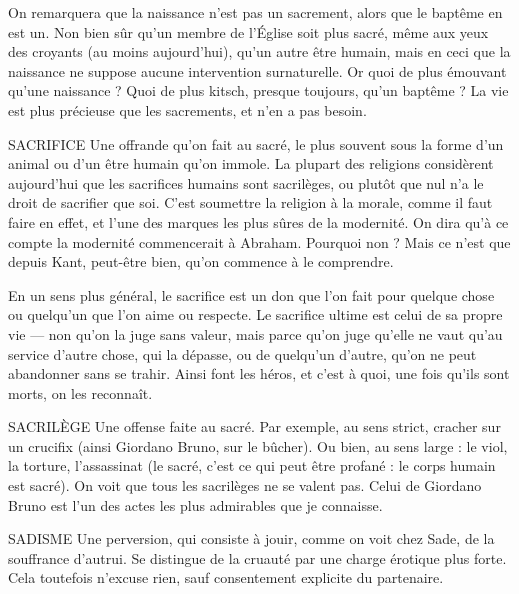 On remarquera que la naissance n’est pas un sacrement, alors que le baptême
en est un. Non bien sûr qu’un membre de l’Église soit plus sacré, même
aux yeux des croyants (au moins aujourd’hui), qu’un autre être humain, mais
en ceci que la naissance ne suppose aucune intervention surnaturelle. Or quoi
de plus émouvant qu’une naissance ? Quoi de plus kitsch, presque toujours,
qu’un baptême ? La vie est plus précieuse que les sacrements, et n'en a pas
besoin.

SACRIFICE Une offrande qu’on fait au sacré, le plus souvent sous la forme
d’un animal ou d’un être humain qu’on immole. La plupart des
religions considèrent aujourd’hui que les sacrifices humains sont sacrilèges, ou
plutôt que nul n’a le droit de sacrifier que soi. C’est soumettre la religion à la
morale, comme il faut faire en effet, et l’une des marques les plus sûres de la
modernité. On dira qu’à ce compte la modernité commencerait à Abraham.
Pourquoi non ? Mais ce n’est que depuis Kant, peut-être bien, qu'on commence
à le comprendre.

En un sens plus général, le sacrifice est un don que l’on fait pour quelque
chose ou quelqu'un que l’on aime ou respecte. Le sacrifice ultime est celui de
sa propre vie — non qu’on la juge sans valeur, mais parce qu’on juge qu’elle ne
vaut qu’au service d’autre chose, qui la dépasse, ou de quelqu'un d’autre, qu'on
ne peut abandonner sans se trahir. Ainsi font les héros, et c’est à quoi, une fois
qu'ils sont morts, on les reconnaît.

SACRILÈGE Une offense faite au sacré. Par exemple, au sens strict, cracher
sur un crucifix (ainsi Giordano Bruno, sur le bûcher). Ou bien,
au sens large : le viol, la torture, l'assassinat (le sacré, c’est ce qui peut être
profané : le corps humain est sacré). On voit que tous les sacrilèges ne se valent
pas. Celui de Giordano Bruno est l’un des actes les plus admirables que je
connaisse.

SADISME Une perversion, qui consiste à jouir, comme on voit chez Sade,
de la souffrance d’autrui. Se distingue de la cruauté par une
charge érotique plus forte. Cela toutefois n’excuse rien, sauf consentement
explicite du partenaire.


